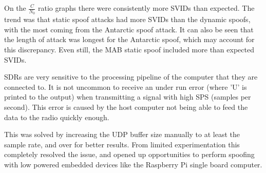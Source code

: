 On the $\frac{C}{N_0}$ ratio graphs there were consistently more SVIDs than expected. The trend was that static spoof attacks had more SVIDs than the dynamic spoofs, with
the most coming from the Antarctic spoof attack. It can also be seen that the length of attack was longest for the Antarctic spoof, which may account for this
discrepancy. Even still, the MAB static spoof included more than expected SVIDs.

SDRs are very sensitive to the processing pipeline of the computer that they are connected to. It is not uncommon to receive an under run error (where 'U' is printed to the
output) when transmitting a signal with high SPS (samples per second). This error is caused by the host computer not being able to feed the data to the radio quickly
enough.

This was solved by increasing the UDP buffer size manually to at least the sample rate, and over for better results. From limited experimentation this completely resolved the issue, and opened up
opportunities to perform spoofing with low powered embedded devices like the Raspberry Pi single board computer.
